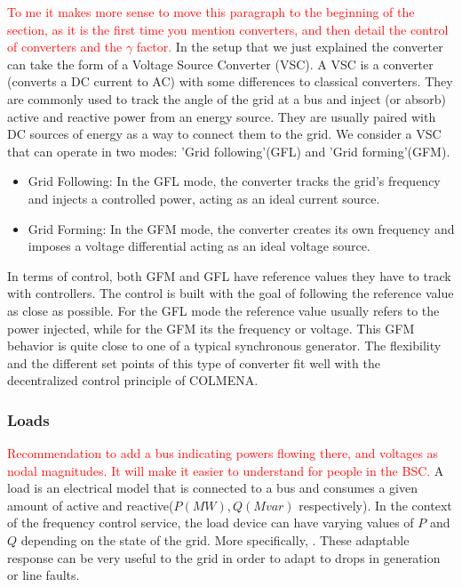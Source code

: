 \documentclass{article}
\begin{document}
\textcolor{red}{To me it makes more sense to move this paragraph to the beginning of the section, as it is the first time you mention converters, and then detail the control of converters and the $\gamma$ factor.}
In the setup that we just explained the converter can take the form of a Voltage Source Converter (VSC). A VSC is a converter (converts a DC current to AC) with some differences to classical converters. They are commonly used to track the angle of the grid at a bus and inject (or absorb) active and reactive power from an energy source. They are usually paired with DC sources of energy as a way to connect them to the grid. We consider a VSC that can operate in two modes: 'Grid following'(GFL) and 'Grid forming'(GFM). 

\begin{itemize}
    \item Grid Following: In the GFL mode, the converter tracks the grid's frequency and injects a controlled power, acting as an ideal current source.
    \item Grid Forming: In the GFM mode, the converter creates its own frequency and imposes a voltage differential acting as an ideal voltage source.
\end{itemize}

In terms of control, both GFM and GFL have reference values they have to track with controllers. The control is built with the goal of following the reference value as close as possible. For the GFL mode the reference value usually refers to the power injected, while for the GFM its the frequency or voltage. This GFM behavior is quite close to one of a typical synchronous generator. The flexibility and the different set points of this type of converter fit well with the decentralized control principle of COLMENA.  

\subsubsection*{Loads}
\textcolor{red}{Recommendation to add a bus indicating powers flowing there, and voltages as nodal magnitudes. It will make it easier to understand for people in the BSC.}
A load is an electrical model that is connected to a bus and consumes a given amount of active and reactive($P(MW),  Q (Mvar)$ respectively). In the context of the frequency control service, the load device can have varying values of $P$ and $Q$ depending on the state of the grid. More specifically, . These adaptable response can be very useful to the grid in order to adapt to drops in generation or line faults.
\end{document}
